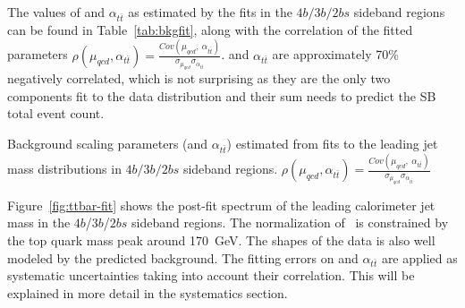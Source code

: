 The values of \muqcd and $\alpha_{t\bar{t}}$ as estimated by the fits in the $4b/3b/2bs$ sideband regions can be found in Table~\ref{tab:bkgfit}, along with the correlation of the fitted parameters $\rho(\mu_{qcd},\alpha_{t\bar{t}}) = \frac{Cov(\mu_{qcd},\ \alpha_{t\bar{t}})}{\sigma_{\mu_{qcd}}\sigma_{\alpha_{t\bar{t}}} }$. \muqcd and $\alpha_{t\bar{t}}$ are approximately 70\% negatively correlated, which is not surprising as they are the only two components fit to the data distribution and their sum needs to predict the SB total event count.

\begin{table}[htbp!]
\begin{center}

\caption{Background scaling parameters (\muqcd and $\alpha_{t\bar{t}}$) estimated from fits to the leading jet mass distributions in $4b/3b/2bs$ sideband regions. $\rho(\mu_{qcd},\alpha_{t\bar{t}}) = \frac{Cov(\mu_{qcd},\ \alpha_{t\bar{t}})}{\sigma_{\mu_{qcd}}\sigma_{\alpha_{t\bar{t}}} }$}
\label{tab:bkgfit}
\end{center}
\end{table}

Figure~\ref{fig:ttbar-fit} shows the post-fit spectrum of the leading \largeR calorimeter jet mass in the $4b$/$3b$/$2bs$ sideband regions. The normalization of \ttbar\ is 
constrained by the top quark mass peak around 170~GeV. The shapes of the data is also well modeled by the predicted background. The fitting errors on \muqcd and 
$\alpha_{t\bar{t}}$ are applied as systematic uncertainties taking into account their correlation. This will be explained in more detail in the systematics section.

